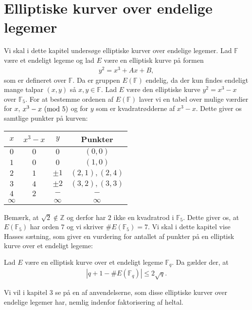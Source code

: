 \chapter{Elliptiske kurver over endelige legemer}

Vi skal i dette kapitel undersøge elliptiske kurver over endelige legemer. 
Lad $\mathbb{F}$ være et endeligt legeme og lad $E$ være en elliptisk kurve på
formen 
\begin{align*}
	y^2 = x^3 + Ax + B,
\end{align*}
som er defineret over $\mathbb{F}$. Da er gruppen $E(\mathbb{F})$ endelig, da 
der kun findes endeligt mange talpar $(x, y)$ så $x, y \in \mathbb{F}$. Lad 
$E$ være den elliptiske kurve $y^2 = x^3 - x$ over $\mathbb{F}_5$. For at bestemme
ordenen af $E(\mathbb{F})$ laver vi en tabel over mulige værdier for $x$, $x^3 - x \ (\mathrm{mod} \ 5)$
og for $y$ som er kvadratrødderne af $x^3 - x$. Dette giver os samtlige punkter på kurven:


\begin{center}
\begin{tabular}{c c c c }
$x$ & $x^3 - x$ & $y$ & Punkter \\ 
\hline
$0$ & $0$ & $0$ & $(0, 0)$ \\ 
$1$ & $0$ & $0$ & $(1, 0)$ \\ 
$2$ & $1$ & $\pm 1$ & $(2, 1), (2, 4)$ \\ 
$3$ & $4$ & $\pm 2$ & $(3, 2), (3, 3)$ \\ 
$4$ & $2$ & $-$ & $-$ \\ 
$\infty$ & & $\infty$ & $\infty$ \\
\end{tabular} 
\end{center}

Bemærk, at $\sqrt{2} \notin \mathbb{Z}$ og derfor har $2$ ikke en kvadratrod i $\mathbb{F}_5$.
Dette giver os, at $E(\mathbb{F}_5)$ har orden $7$ og vi skriver $\#E(\mathbb{F}_5)=7$. Vi skal
i dette kapitel vise Hasses sætning, som giver en vurdering for antallet af punkter på en elliptisk
kurve over et endeligt legeme:

\begin{theorem}[Hasse]
\label{hasse}
Lad $E$ være en elliptisk kurve over et endeligt legeme $\mathbb{F}_q$. Da gælder der, at 
\begin{align*}
	|q + 1 - \#E(\mathbb{F}_q)| \leq 2 \sqrt{q}.
\end{align*}
\end{theorem}
Vi vil i kapitel 3 se på en af anvendelserne, som disse elliptiske kurver over endelige legemer har, 
nemlig indenfor faktorisering af heltal.

